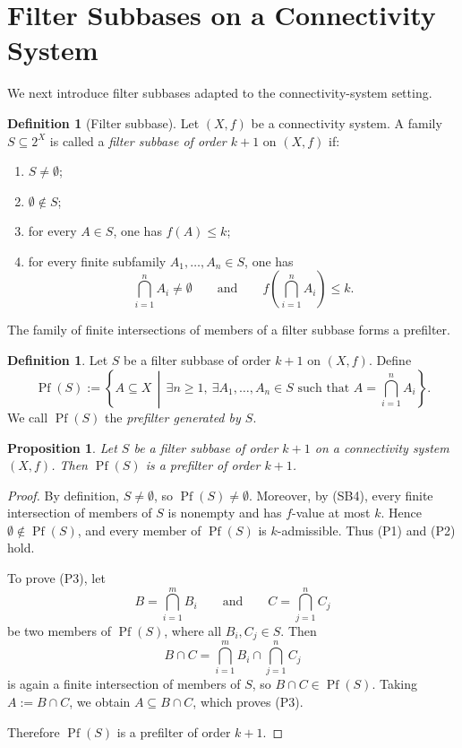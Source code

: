 \documentclass[10pt]{book}
\newtheorem{proposition}[theorem]{Proposition}
\theoremstyle{definition}
\newtheorem{definition}[theorem]{Definition}
\begin{document}
\section{Filter Subbases on a Connectivity System}

We next introduce filter subbases adapted to the connectivity-system setting.

\begin{definition}[Filter subbase]
\label{def:filter_subbase}
Let \((X,f)\) be a connectivity system.
A family \(S\subseteq 2^X\) is called a \emph{filter subbase of order \(k+1\)} on \((X,f)\) if:
\begin{enumerate}
    \item[(SB1)] \(S\neq \emptyset\);
    \item[(SB2)] \(\emptyset\notin S\);
    \item[(SB3)] for every \(A\in S\), one has \(f(A)\leq k\);
    \item[(SB4)] for every finite subfamily \(A_1,\dots,A_n\in S\), one has
    \[
    \bigcap_{i=1}^n A_i \neq \emptyset
    \qquad\text{and}\qquad
    f\!\left(\bigcap_{i=1}^n A_i\right)\leq k.
    \]
\end{enumerate}
\end{definition}

The family of finite intersections of members of a filter subbase forms a prefilter.

\begin{definition}
\label{def:prefilter_generated_by_subbase}
Let \(S\) be a filter subbase of order \(k+1\) on \((X,f)\).
Define
\[
\operatorname{Pf}(S)
:=
\left\{
A\subseteq X \,\middle|\,
\exists n\geq 1,\ \exists A_1,\dots,A_n\in S
\text{ such that }
A=\bigcap_{i=1}^n A_i
\right\}.
\]
We call \(\operatorname{Pf}(S)\) the \emph{prefilter generated by \(S\)}.
\end{definition}

\begin{proposition}
\label{thm:prefilter_generated_by_subbase}
Let \(S\) be a filter subbase of order \(k+1\) on a connectivity system \((X,f)\).
Then \(\operatorname{Pf}(S)\) is a prefilter of order \(k+1\).
\end{proposition}

\begin{proof}
By definition, \(S\neq \emptyset\), so \(\operatorname{Pf}(S)\neq \emptyset\).
Moreover, by (SB4), every finite intersection of members of \(S\) is nonempty and has \(f\)-value at most \(k\).
Hence \(\emptyset\notin \operatorname{Pf}(S)\), and every member of \(\operatorname{Pf}(S)\) is \(k\)-admissible.
Thus (P1) and (P2) hold.

To prove (P3), let
\[
B=\bigcap_{i=1}^m B_i
\qquad\text{and}\qquad
C=\bigcap_{j=1}^n C_j
\]
be two members of \(\operatorname{Pf}(S)\), where all \(B_i,C_j\in S\).
Then
\[
B\cap C=\bigcap_{i=1}^m B_i \cap \bigcap_{j=1}^n C_j
\]
is again a finite intersection of members of \(S\), so \(B\cap C\in \operatorname{Pf}(S)\).
Taking \(A:=B\cap C\), we obtain \(A\subseteq B\cap C\), which proves (P3).

Therefore \(\operatorname{Pf}(S)\) is a prefilter of order \(k+1\).
\end{proof}
\end{document}
